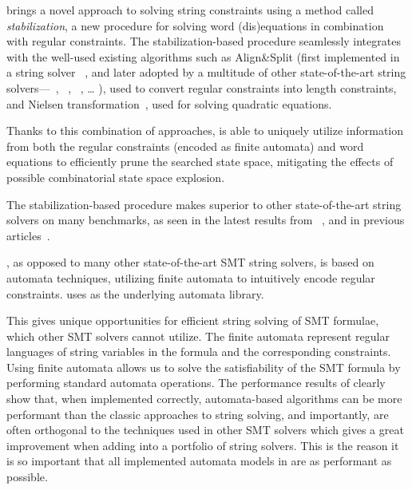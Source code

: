 \noodler brings a novel approach to solving string constraints using a method called \emph{stabilization}, a new procedure for solving word (dis)equations in combination with regular constraints.
The stabilization-based procedure seamlessly integrates with the well-used existing algorithms such as
Align\&Split (first implemented in a string solver \norn~\cite{Norn,AutomataSplitting}, and later adopted by a multitude of other state-of-the-art string solvers---\ostrich~\cite{AnthonyTowards2016,AnthonyReplaceAll2018,AnthonyComplex2019,AnthonyRegex2022,AnthonyInteger2020},
\ziiistriiire~\cite{Z3str3RE,BerzishDGKMMN23}, \sloth~\cite{holik_string_2018}, \ldots
), used to convert regular constraints into length constraints, and
Nielsen transformation~\cite{nielsen1917}, used for solving quadratic equations.

Thanks to this combination of approaches, \noodler is able to uniquely utilize information from both the regular constraints (encoded as finite automata) and word equations to efficiently prune the searched state space, mitigating the effects of possible combinatorial state space explosion.

The stabilization-based procedure makes \noodler superior to other state-of-the-art string solvers on many benchmarks, as seen in the latest results from \noodler~\cite{tacas24_noodler_10.1007/978-3-031-57246-3_2}, and in previous articles~\cite{fm23_equations_synergy_regular_constraints_DBLP:conf/fm/BlahoudekCCHHLS23, oopsla23_stabilization_DBLP:journals/pacmpl/ChenCHHLS23}.

\noodler, as opposed to many other state-of-the-art SMT string solvers, is based on automata techniques, utilizing finite automata to intuitively encode regular constraints.
\noodler uses \mata as the underlying automata library.

This gives \noodler unique opportunities for efficient string solving of SMT formulae, which other SMT solvers cannot utilize.
The finite automata represent regular languages of string variables in the formula and the corresponding constraints.
Using finite automata allows us to solve the satisfiability of the SMT formula by performing standard automata operations.
The performance results of \noodler clearly show that, when implemented correctly, automata-based algorithms can be more performant than the classic approaches to string solving, and importantly, are often orthogonal to the techniques used in other SMT solvers which gives a great improvement when adding \noodler into a portfolio of string solvers.
This is the reason it is so important that all implemented automata models in \mata are as performant as possible.


